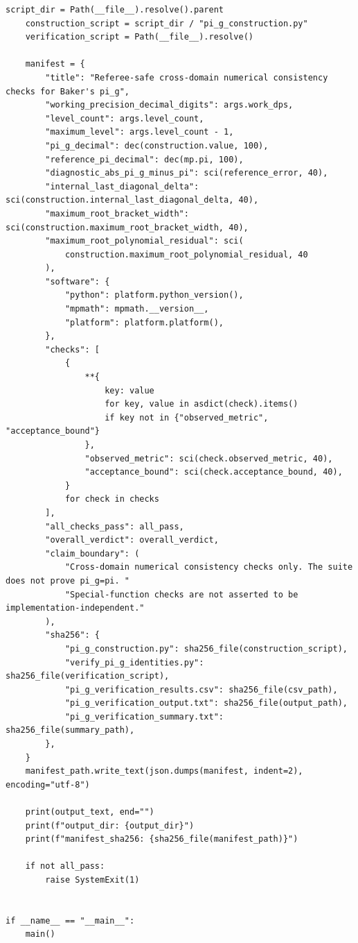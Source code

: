 \documentclass[11pt]{article}
\begin{document}
\begin{lstlisting}[style=pythonstyle,caption={\texttt{verify\_pi\_g\_identities.py}}]
    script_dir = Path(__file__).resolve().parent
    construction_script = script_dir / "pi_g_construction.py"
    verification_script = Path(__file__).resolve()

    manifest = {
        "title": "Referee-safe cross-domain numerical consistency checks for Baker's pi_g",
        "working_precision_decimal_digits": args.work_dps,
        "level_count": args.level_count,
        "maximum_level": args.level_count - 1,
        "pi_g_decimal": dec(construction.value, 100),
        "reference_pi_decimal": dec(mp.pi, 100),
        "diagnostic_abs_pi_g_minus_pi": sci(reference_error, 40),
        "internal_last_diagonal_delta": sci(construction.internal_last_diagonal_delta, 40),
        "maximum_root_bracket_width": sci(construction.maximum_root_bracket_width, 40),
        "maximum_root_polynomial_residual": sci(
            construction.maximum_root_polynomial_residual, 40
        ),
        "software": {
            "python": platform.python_version(),
            "mpmath": mpmath.__version__,
            "platform": platform.platform(),
        },
        "checks": [
            {
                **{
                    key: value
                    for key, value in asdict(check).items()
                    if key not in {"observed_metric", "acceptance_bound"}
                },
                "observed_metric": sci(check.observed_metric, 40),
                "acceptance_bound": sci(check.acceptance_bound, 40),
            }
            for check in checks
        ],
        "all_checks_pass": all_pass,
        "overall_verdict": overall_verdict,
        "claim_boundary": (
            "Cross-domain numerical consistency checks only. The suite does not prove pi_g=pi. "
            "Special-function checks are not asserted to be implementation-independent."
        ),
        "sha256": {
            "pi_g_construction.py": sha256_file(construction_script),
            "verify_pi_g_identities.py": sha256_file(verification_script),
            "pi_g_verification_results.csv": sha256_file(csv_path),
            "pi_g_verification_output.txt": sha256_file(output_path),
            "pi_g_verification_summary.txt": sha256_file(summary_path),
        },
    }
    manifest_path.write_text(json.dumps(manifest, indent=2), encoding="utf-8")

    print(output_text, end="")
    print(f"output_dir: {output_dir}")
    print(f"manifest_sha256: {sha256_file(manifest_path)}")

    if not all_pass:
        raise SystemExit(1)


if __name__ == "__main__":
    main()
\end{lstlisting}
\end{document}
